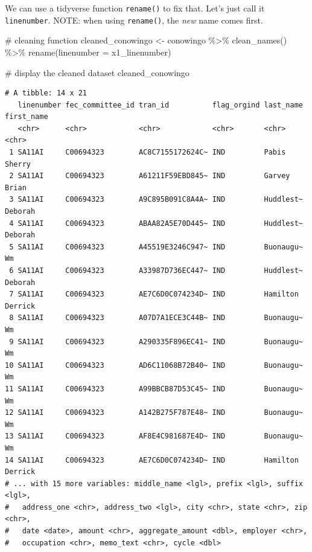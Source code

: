 \documentclass[
  letterpaper,
  DIV=11,
  numbers=noendperiod]{scrreprt}
\newenvironment{Shaded}{\begin{snugshade}}{\end{snugshade}}
\newcommand{\AttributeTok}[1]{\textcolor[rgb]{0.40,0.45,0.13}{#1}}
\newcommand{\CommentTok}[1]{\textcolor[rgb]{0.37,0.37,0.37}{#1}}
\newcommand{\FunctionTok}[1]{\textcolor[rgb]{0.28,0.35,0.67}{#1}}
\newcommand{\NormalTok}[1]{\textcolor[rgb]{0.00,0.23,0.31}{#1}}
\newcommand{\OtherTok}[1]{\textcolor[rgb]{0.00,0.23,0.31}{#1}}
\newcommand{\SpecialCharTok}[1]{\textcolor[rgb]{0.37,0.37,0.37}{#1}}
\begin{document}
We can use a tidyverse function \texttt{rename()} to fix that. Let's
just call it \texttt{linenumber}. NOTE: when using \texttt{rename()},
the \emph{new} name comes first.

\begin{Shaded}
\begin{Highlighting}[]
\CommentTok{\# cleaning function}
\NormalTok{cleaned\_conowingo }\OtherTok{\textless{}{-}}\NormalTok{ conowingo }\SpecialCharTok{\%\textgreater{}\%}
  \FunctionTok{clean\_names}\NormalTok{() }\SpecialCharTok{\%\textgreater{}\%} 
  \FunctionTok{rename}\NormalTok{(}\AttributeTok{linenumber =}\NormalTok{ x1\_linenumber)}

\CommentTok{\# display the cleaned dataset}
\NormalTok{cleaned\_conowingo}
\end{Highlighting}
\end{Shaded}

\begin{verbatim}
# A tibble: 14 x 21
   linenumber fec_committee_id tran_id          flag_orgind last_name first_name
   <chr>      <chr>            <chr>            <chr>       <chr>     <chr>     
 1 SA11AI     C00694323        AC8C7155172624C~ IND         Pabis     Sherry    
 2 SA11AI     C00694323        A61211F59EBD845~ IND         Garvey    Brian     
 3 SA11AI     C00694323        A9C895B091C8A4A~ IND         Huddlest~ Deborah   
 4 SA11AI     C00694323        ABAA82A5E70D445~ IND         Huddlest~ Deborah   
 5 SA11AI     C00694323        A45519E3246C947~ IND         Buonaugu~ Wm        
 6 SA11AI     C00694323        A33987D736EC447~ IND         Huddlest~ Deborah   
 7 SA11AI     C00694323        AE7C6D0C074234D~ IND         Hamilton  Derrick   
 8 SA11AI     C00694323        A07D7A1ECE3C44B~ IND         Buonaugu~ Wm        
 9 SA11AI     C00694323        A290335F896EC41~ IND         Buonaugu~ Wm        
10 SA11AI     C00694323        AD6C11068B72B40~ IND         Buonaugu~ Wm        
11 SA11AI     C00694323        A99BBCB87D53C45~ IND         Buonaugu~ Wm        
12 SA11AI     C00694323        A142B275F787E48~ IND         Buonaugu~ Wm        
13 SA11AI     C00694323        AF8E4C981687E4D~ IND         Buonaugu~ Wm        
14 SA11AI     C00694323        AE7C6D0C074234D~ IND         Hamilton  Derrick   
# ... with 15 more variables: middle_name <lgl>, prefix <lgl>, suffix <lgl>,
#   address_one <chr>, address_two <lgl>, city <chr>, state <chr>, zip <chr>,
#   date <date>, amount <chr>, aggregate_amount <dbl>, employer <chr>,
#   occupation <chr>, memo_text <chr>, cycle <dbl>
\end{verbatim}
\end{document}
